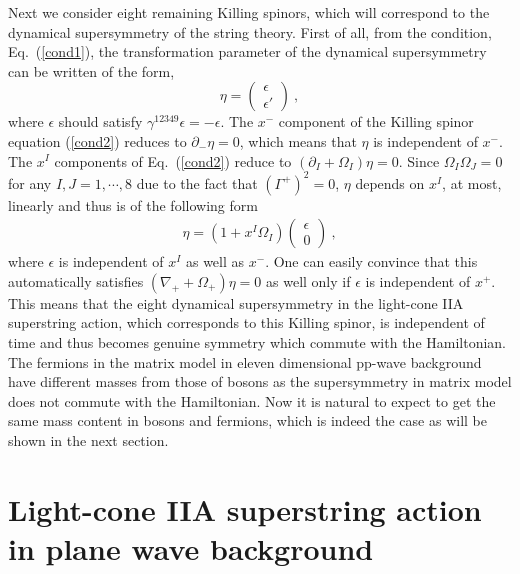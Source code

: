 \documentclass[a4paper,12pt]{article}
\begin{document}
Next we consider eight remaining Killing spinors, which will
correspond to the dynamical supersymmetry of the string theory.  First
of all, from the condition, Eq.~(\ref{cond1}), the transformation
parameter of the dynamical supersymmetry can be written of the form,
\begin{equation}
\eta = \left( \begin{array}{c} \epsilon \\ \epsilon' \end{array}
       \right) ~,
 \label{dyn}
\end{equation} 
where $\epsilon$ should satisfy $\gamma^{12349}\epsilon=-\epsilon$.
The $x^-$ component of the Killing spinor equation (\ref{cond2})
reduces to $\partial_-\eta =0$, which means that $\eta$ is independent
of $x^-$.  The $x^I$ components of Eq.~(\ref{cond2}) reduce to
$(\partial_I + \Omega_I ) \eta =0$. Since $\Omega_I\Omega_J=0$ for any
$I, J =1, \cdots , 8$ due to the fact that $(\Gamma^+)^2=0$, $\eta$
depends on $x^I$, at most, linearly and thus is of the following form
\begin{eqnarray}
\eta = (1+x^I\Omega_I) \left( \begin{array}{c} \epsilon \\ 0
    \end{array} \right)~,
\label{epsilon}
\end{eqnarray}
where $\epsilon$ is independent of $x^I$ as well as $x^-$. One can
easily convince that this automatically satisfies $(\nabla_+ +
\Omega_+ ) \eta =0$ as well only if $\epsilon$ is independent of
$x^+$. This means that the eight dynamical supersymmetry in the
light-cone IIA superstring action, which corresponds to this Killing
spinor, is independent of time and thus becomes genuine symmetry which
commute with the Hamiltonian. The fermions in the matrix model in
eleven dimensional pp-wave background have different masses from those
of bosons as the supersymmetry in matrix model does not commute with
the Hamiltonian. Now it is natural to expect to get the same mass
content in bosons and fermions, which is indeed the case as will be
shown in the next section.




\section{Light-cone IIA superstring action in plane wave background}
\end{document}
